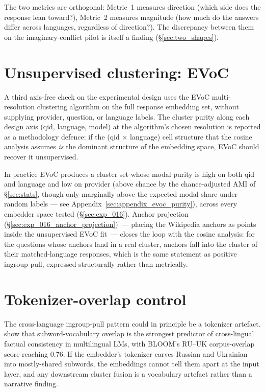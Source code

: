 The two metrics are orthogonal: Metric~1 measures direction (which
side does the response lean toward?), Metric~2 measures magnitude
(how much do the answers differ across languages, regardless of
direction?). The discrepancy between them on the imaginary-conflict
pilot is itself a finding (\S\ref{sec:two_shapes}).

\section{Unsupervised clustering: EVoC}\label{sec:evoc}

A third axis-free check on the experimental design uses the EVoC
multi-resolution clustering algorithm \citep{mcinnes2024evoc} on the
full response embedding set, without supplying provider, question, or
language labels. The cluster purity along each design axis (qid,
language, model) at the algorithm's chosen resolution is reported as
a methodology defence: if the (qid \(\times\) language) cell
structure that the cosine analysis assumes \emph{is} the dominant
structure of the embedding space, EVoC should recover it
unsupervised.

In practice EVoC produces a cluster set whose modal purity is high
on both qid and language and low on provider (above chance by the
chance-adjusted AMI of \S\ref{sec:stats}, though only marginally
above the expected modal share under random labels --- see
Appendix~\ref{sec:appendix_evoc_purity}), across every
embedder space tested (\S\ref{sec:exp_016}). Anchor projection
(\S\ref{sec:exp_016_anchor_projection})~--- placing the Wikipedia
anchors as points inside the unsupervised EVoC fit~--- closes the
loop with the cosine analysis: for the questions whose anchors land
in a real cluster, anchors fall into the cluster of
their matched-language responses, which is the same statement as
positive ingroup pull, expressed structurally rather than
metrically.

\section{Tokenizer-overlap control}\label{sec:tokenizer_control}

The cross-language ingroup-pull pattern could in principle be a
tokenizer artefact. \citet{qi2023crosslingual} show that subword-vocabulary
overlap is the strongest predictor of cross-lingual factual
consistency in multilingual LMs, with BLOOM's RU--UK corpus-overlap
score reaching 0.76. If the embedder's tokenizer carves Russian and
Ukrainian into mostly-shared subwords, the embeddings cannot tell
them apart at the input layer, and any downstream cluster fusion is
a vocabulary artefact rather than a narrative finding.

